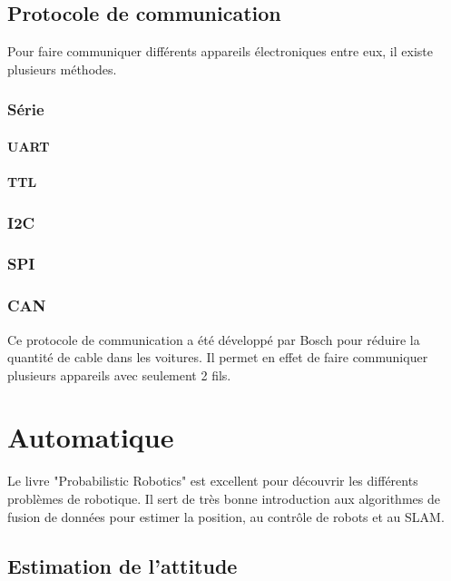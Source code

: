 \documentclass[a4paper, 11pt]{report}
\begin{document}
\chapter{Protocole de communication}

Pour faire communiquer différents appareils électroniques entre eux, il existe plusieurs méthodes.

\section{Série}

\subsection{UART}

\subsection{TTL}

\section{I2C}

\section{SPI}

\section{CAN}
Ce protocole de communication a été développé par Bosch pour réduire la quantité de cable dans les voitures. Il permet en effet de faire communiquer plusieurs appareils avec seulement 2 fils.

\part{Automatique}

Le livre "Probabilistic Robotics" est excellent pour découvrir les différents problèmes de robotique. Il sert de très bonne introduction aux algorithmes de fusion de données pour estimer la position, au contrôle de robots et au SLAM.

\chapter{Estimation de l'attitude}
\end{document}
